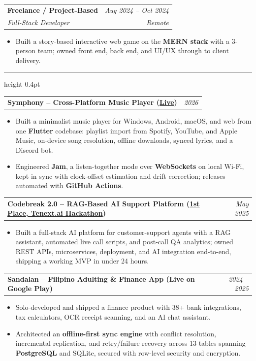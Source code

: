 \documentclass[11pt,a4paper]{article}
\makeatletter
\newcommand{\cvsection}[1]{%
  \par\addvspace{9pt}%
  \noindent{\small\bfseries\color{ink}\MakeUppercase{#1}}%
  \par\nobreak\vspace{2.5pt}%
  {\color{ink}\hrule height 0.4pt}%
  \nobreak\vspace{3pt}%
}
\newcommand{\entry}[4]{%
  \par\smallskip
  \noindent\begin{tabular*}{\linewidth}{@{\extracolsep{\fill}}l r@{}}
    \textbf{#1} & {\small\itshape\color{muted}#3} \\[-2pt]
    {\small\itshape\color{muted}#2} & {\small\itshape\color{muted}#4} \\
  \end{tabular*}\par\vspace{-2pt}
}
\newcommand{\projitem}[2]{%
  \par\smallskip
  \noindent\begin{tabular*}{\linewidth}{@{\extracolsep{\fill}}l r@{}}
    \textbf{#1} & {\small\itshape\color{muted}#2} \\
  \end{tabular*}\par\vspace{-2pt}
}
\makeatother
\begin{document}
\entry{Freelance / Project-Based}{Full-Stack Developer}{Aug 2024 -- Oct 2024}{Remote}
\begin{itemize}
  \item Built a story-based interactive web game on the \textbf{MERN stack} with a 3-person team; owned front end, back end, and UI/UX through to client delivery.
\end{itemize}

\cvsection{Selected Projects}

\projitem{Symphony -- Cross-Platform Music Player \textnormal{(\href{https://symphony.jettimothycerezo.dev}{Live})}}{2026}
\begin{itemize}
  \item Built a minimalist music player for Windows, Android, macOS, and web from one \textbf{Flutter} codebase: playlist import from Spotify, YouTube, and Apple Music, on-device song resolution, offline downloads, synced lyrics, and a Discord bot.
  \item Engineered \textbf{Jam}, a listen-together mode over \textbf{WebSockets} on local Wi-Fi, kept in sync with clock-offset estimation and drift correction; releases automated with \textbf{GitHub Actions}.
\end{itemize}

\projitem{Codebreak 2.0 -- RAG-Based AI Support Platform \textnormal{(\href{https://www.facebook.com/photo/?fbid=706685865053901\&set=a.263981095991049}{1st Place, Tenext.ai Hackathon})}}{May 2025}
\begin{itemize}
  \item Built a full-stack AI platform for customer-support agents with a RAG assistant, automated live call scripts, and post-call QA analytics; owned REST APIs, microservices, deployment, and AI integration end-to-end, shipping a working MVP in under 24 hours.
\end{itemize}

\projitem{Sandalan -- Filipino Adulting \& Finance App \textnormal{(Live on Google Play)}}{2024 -- 2025}
\begin{itemize}
  \item Solo-developed and shipped a finance product with 38+ bank integrations, tax calculators, OCR receipt scanning, and an AI chat assistant.
  \item Architected an \textbf{offline-first sync engine} with conflict resolution, incremental replication, and retry/failure recovery across 13 tables spanning \textbf{PostgreSQL} and SQLite, secured with row-level security and encryption.
\end{itemize}
\end{document}
